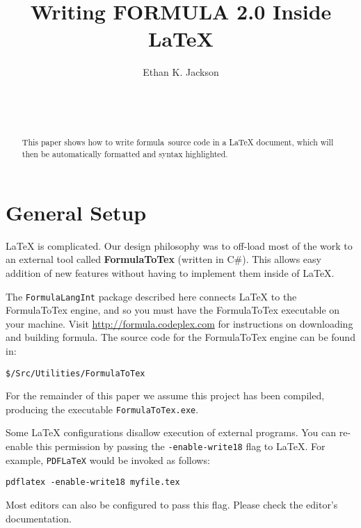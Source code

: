 \documentclass{sig-alternate}
\newcommand{\frm}{{\sc formula}}
\begin{document}


\title{Writing FORMULA 2.0 Inside LaTeX}
\author{
\alignauthor
Ethan K. Jackson\\
       \\
       \\
       \\
       }
\toappear{}
\maketitle
\begin{abstract}
This paper shows how to write \frm~source code in a LaTeX document, which will then be automatically formatted and syntax highlighted.
\end{abstract}

\section{General Setup}
LaTeX is complicated. Our design philosophy was to off-load most of the work to an external tool called \textbf{FormulaToTex} (written in C\#). This allows easy addition of new features without having to implement them inside of LaTeX. 

The \texttt{FormulaLangInt} package described here connects LaTeX to the FormulaToTex engine, and so you must have the FormulaToTex executable on your machine. Visit \url{http://formula.codeplex.com} for instructions on downloading and building \frm. The source code for the FormulaToTex engine can be found in: 
\begin{verbatim}
$/Src/Utilities/FormulaToTex
\end{verbatim}
For the remainder of this paper we assume this project has been compiled, producing the executable \texttt{FormulaToTex.exe}.

Some LaTeX configurations disallow execution of external programs. You can re-enable this permission by passing the \texttt{-enable-write18} flag to LaTeX. For example, \texttt{PDFLaTeX} would be invoked as follows:
\begin{verbatim}
pdflatex -enable-write18 myfile.tex
\end{verbatim} 
Most editors can also be configured to pass this flag. Please check the editor's documentation.
\end{document}
